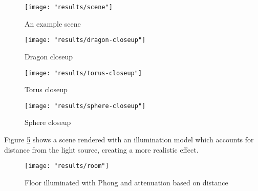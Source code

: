 \begin{figure}
    \caption{An example scene}
    \begin{center}
        \texttt{[image: "results/scene"]}
    \end{center}
    \label{fig:scene_2}
\end{figure}

\begin{figure}
    \caption{Dragon closeup}
    \begin{center}
        \texttt{[image: "results/dragon-closeup"]}
    \end{center}
    \label{fig:dragon_closeup}
\end{figure}

\begin{figure}
    \caption{Torus closeup}
    \begin{center}
        \texttt{[image: "results/torus-closeup"]}
    \end{center}
    \label{fig:torus_closeup}
\end{figure}

\begin{figure}
    \caption{Sphere closeup}
    \begin{center}
        \texttt{[image: "results/sphere-closeup"]}
    \end{center}
    \label{fig:sphere_closeup}
\end{figure}

Figure \ref{fig:room_floor} shows a scene rendered with an illumination model which accounts for distance from the light source, creating a more realistic effect.

\begin{figure}[ht]
    \caption{Floor illuminated with Phong and attenuation based on distance}
    \begin{center}
        \texttt{[image: "results/room"]}
    \end{center}
    \label{fig:room_floor}
\end{figure}
